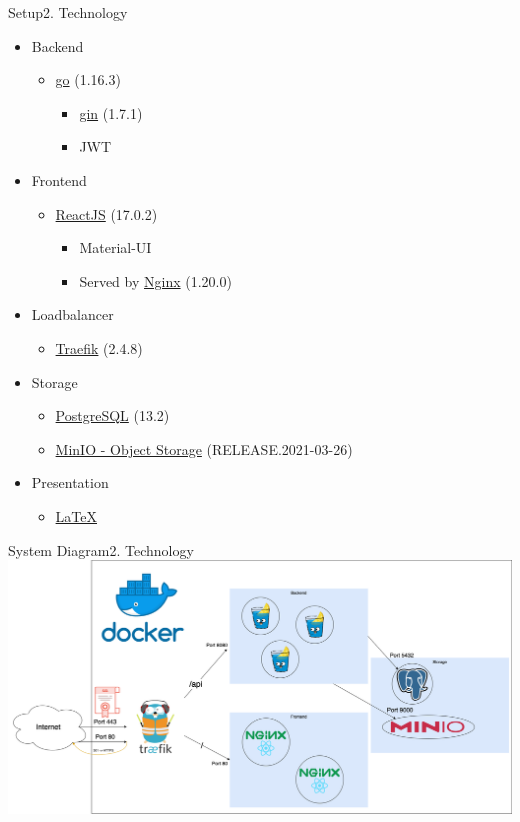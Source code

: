 \documentclass[aspectratio=169,20pt]{beamer}
\begin{document}
\begin{frame}{Setup}{2. Technology}
	\begin{itemize}
		\item{Backend}
		\begin{itemize}
			\item{\href{https://golang.org/}{go} (1.16.3)}
			\begin{itemize}
				\item{\href{https://gin-gonic.com/}{gin} (1.7.1)}
				\item{JWT}
			\end{itemize}
		\end{itemize}
		\item{Frontend}
		\begin{itemize}
			\item{\href{https://reactjs.org/versions/}{ReactJS} (17.0.2)}
			\begin{itemize}
				\item{Material-UI}
				\item{Served by \href{https://nginx.org/}{Nginx} (1.20.0)}
			\end{itemize}
		\end{itemize}
		\item{Loadbalancer}
		\begin{itemize}
			\item{\href{https://traefik.io/}{Traefik} (2.4.8)}
		\end{itemize} 
		\item{Storage}
		\begin{itemize}
			\item{\href{https://www.postgresql.org/}{PostgreSQL} (13.2)}
			\item{\href{https://min.io/}{MinIO - Object Storage} (RELEASE.2021-03-26)}
		\end{itemize}
		\item{Presentation}
		\begin{itemize}
			\item{\href{https://github.com/ost-fh/Latex-Beamer-Theme}{LaTeX}}
		\end{itemize}       
	\end{itemize}
\end{frame}

\begin{frame}{System Diagram}{2. Technology}
	\includegraphics[scale=0.45]{Infrastruktur}	
\end{frame}
\end{document}
